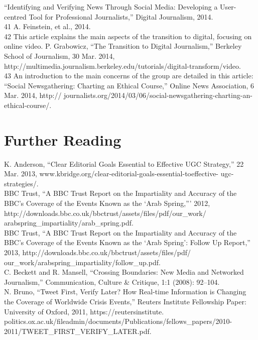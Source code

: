 \begin{enumerate}
``Identifying and Verifying News Through Social Media: Developing a User-centred Tool for
Professional Journalists,'' Digital Journalism, 2014.\\
41 A. Feinstein, et al., 2014.\\
42 This article explains the main aspects of the transition to digital, focusing on online video. P.
Grabowicz, ``The Transition to Digital Journalism,'' Berkeley School of Journalism, 30 Mar. 2014,
http://multimedia.journalism.berkeley.edu/tutorials/digital-transform/video.\\
43 An introduction to the main concerns of the group are detailed in this article: ``Social
Newsgathering: Charting an Ethical Course,'' Online News Association, 6 Mar. 2014, http://
journalists.org/2014/03/06/social-newsgathering-charting-an-ethical-course/.\\

\chapter{Further Reading}

K. Anderson, ``Clear Editorial Goals Essential to Effective UGC Strategy,''
22 Mar. 2013, www.kbridge.org/clear-editorial-goals-essential-toeffective-
ugc-strategies/.\\
BBC Trust, ``A BBC Trust Report on the Impartiality and Accuracy of
the BBC's Coverage of the Events Known as the ‘Arab Spring,''' 2012,
http://downloads.bbc.co.uk/bbctrust/assets/files/pdf/our_work/
arabspring_impartiality/arab_spring.pdf.\\
BBC Trust, ``A BBC Trust Report on the Impartiality and Accuracy of
the BBC's Coverage of the Events Known as the ‘Arab Spring': Follow Up
Report,'' 2013, http://downloads.bbc.co.uk/bbctrust/assets/files/pdf/
our_work/arabspring_impartiality/follow_up.pdf.\\
C. Beckett and R. Mansell, ``Crossing Boundaries: New Media and
Networked Journalism,'' Communication, Culture & Critique, 1:1
(2008): 92–104.\\
N. Bruno, ``Tweet First, Verify Later? How Real-time Information is
Changing the Coverage of Worldwide Crisis Events,'' Reuters Institute
Fellowship Paper: University of Oxford, 2011, https://reutersinstitute.
politics.ox.ac.uk/fileadmin/documents/Publications/fellows_papers/2010-2011/TWEET_FIRST_VERIFY_LATER.pdf.\\


\end{enumerate}
